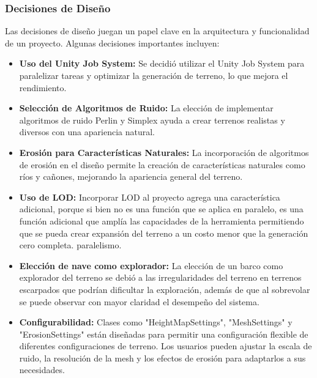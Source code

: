 \subsubsection{Decisiones de Diseño}
Las decisiones de diseño juegan un papel clave en la arquitectura y funcionalidad de un proyecto. Algunas decisiones importantes incluyen:

\begin{itemize}
    \item \textbf{Uso del Unity Job System:} Se decidió utilizar el Unity Job System para paralelizar tareas y optimizar la generación de terreno, lo que mejora el rendimiento.
    
    \item \textbf{Selección de Algoritmos de Ruido:} La elección de implementar algoritmos de ruido Perlin y Simplex ayuda a crear terrenos realistas y diversos con una apariencia natural.
    
    \item \textbf{Erosión para Características Naturales:} La incorporación de algoritmos de erosión en el diseño permite la creación de características naturales como ríos y cañones, mejorando la apariencia general del terreno.
    
    \item \textbf{Uso de LOD:} Incorporar LOD al proyecto agrega una característica adicional, porque si bien no es una función que se aplica en paralelo, es una función adicional que amplía las capacidades de la herramienta permitiendo que se pueda crear expansión del terreno a un costo menor que la generación cero completa. paralelismo.
    
    \item \textbf{Elección de nave como explorador:} La elección de un barco como explorador del terreno se debió a las irregularidades del terreno en terrenos escarpados que podrían dificultar la exploración, además de que al sobrevolar se puede observar con mayor claridad el desempeño del sistema.
    
    \item \textbf{Configurabilidad:} Clases como "HeightMapSettings", "MeshSettings" y "ErosionSettings" están diseñadas para permitir una configuración flexible de diferentes configuraciones de terreno. Los usuarios pueden ajustar la escala de ruido, la resolución de la mesh y los efectos de erosión para adaptarlos a sus necesidades.
    
\end{itemize}

